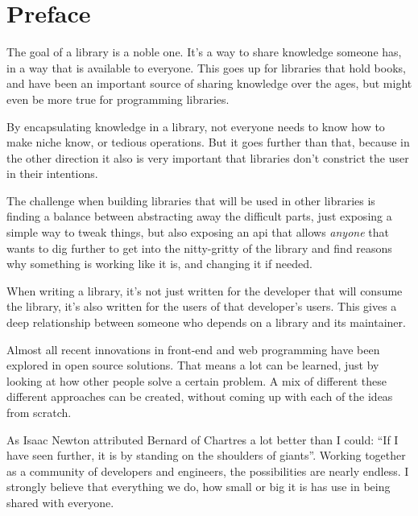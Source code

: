 
\chapter{Preface}%
\label{chp:preface}

The goal of a \gls{library} is a noble one. It's a way to share knowledge someone has, in a way that is available to everyone. This goes up for libraries that hold books, and have been an important source of sharing knowledge over the ages, but might even be more true for programming libraries. 

By encapsulating knowledge in a \gls{library}, not everyone needs to know how to make niche know, or tedious operations. But it goes further than that, because in the other direction it also is very important that libraries don't constrict the user in their intentions.

The challenge when building libraries that will be used in other libraries is finding a balance between abstracting away the difficult parts, just exposing a simple way to tweak things, but also exposing an \acrshort{api} that allows \emph{anyone} that wants to dig further to get into the nitty-gritty of the \gls{library} and find reasons why something is working like it is, and changing it if needed.

When writing a \acrshort{library}, it's not just written for the developer that will consume the library, it's also written for the users of that developer's users. This gives a deep relationship between someone who depends on a \gls{library} and its maintainer.

Almost all recent innovations in front-end and web programming have been explored in open source solutions. That means a lot can be learned, just by looking at how other people solve a certain problem. A mix of different these different approaches can be created, without coming up with each of the ideas from scratch. 

As Isaac Newton\cite{newton-giants} attributed Bernard of Chartres\cite{quote-giants-source} a lot better than I could: ``If I have seen further, it is by standing on the shoulders of giants''. Working together as a community of developers and engineers, the possibilities are nearly endless. I strongly believe that everything we do, how small or big it is has use in being shared with everyone.
